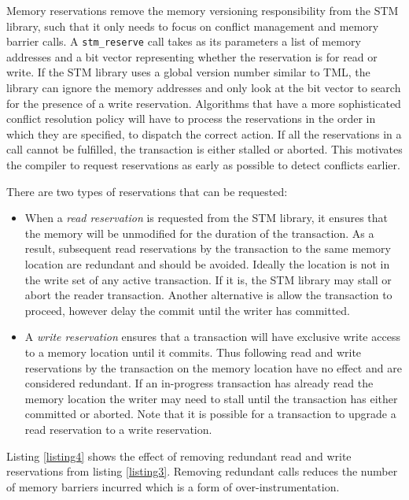 \documentclass[preprint]{sigplanconf}
\begin{document}
Memory reservations remove the memory versioning responsibility from the STM library, such that it only needs to focus on conflict management and memory barrier calls. A \verb+stm_reserve+ call takes as its parameters a list of memory addresses and a bit vector representing whether the reservation is for read or write. If the STM library uses a global version number similar to TML\cite{Dalessandro:2010:TML:1885276.1885279}, the library can ignore the memory addresses and only look at the bit vector to search for the presence of a write reservation. Algorithms that have a more sophisticated conflict resolution policy will have to process the reservations in the order in which they are specified, to dispatch the correct action. If all the reservations in a call cannot be fulfilled, the transaction is either stalled or aborted. This motivates the compiler to request reservations as early as possible to detect conflicts earlier.

There are two types of reservations that can be requested:

\begin{itemize}

    \item When a \emph{read reservation} is requested from the STM library, it ensures that the memory will be unmodified for the duration of the transaction. As a result, subsequent read reservations by the transaction to the same memory location are redundant and should be avoided. Ideally the location is not in the write set of any active transaction. If it is, the STM library may stall or abort the reader transaction. Another alternative is allow the transaction to proceed, however delay the commit until the writer has committed.

    \item A \emph{write reservation} ensures that a transaction will have exclusive write access to a memory location until it commits. Thus following read and write reservations by the transaction on the memory location have no effect and are considered redundant. If an in-progress transaction has already read the memory location the writer may need to stall until the transaction has either committed or aborted. Note that it is possible for a transaction to upgrade a read reservation to a write reservation.

\end{itemize}

Listing \ref{listing4} shows the effect of removing redundant read and write reservations from listing \ref{listing3}. Removing redundant calls reduces the number of memory barriers incurred which is a form of over-instrumentation\cite{Yoo:2008:KTS:1378533.1378582}.
\end{document}
